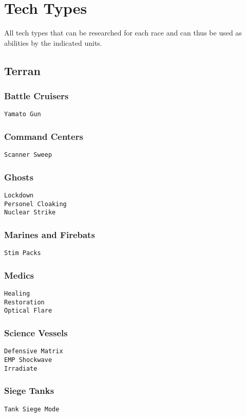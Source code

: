 \chapter{Tech Types}
\label{techtype}
All tech types that can be researched for each race and can thus be used as abilities by the indicated units.

\section{Terran}

\subsection{Battle Cruisers}
\verb|Yamato Gun|

\subsection{Command Centers}
\verb|Scanner Sweep| 

\subsection{Ghosts}
\verb|Lockdown| \\
\verb|Personel Cloaking| \\
\verb|Nuclear Strike|

\subsection{Marines and Firebats}
\verb|Stim Packs|

\subsection{Medics}
\verb|Healing| \\
\verb|Restoration| \\
\verb|Optical Flare|

\subsection{Science Vessels}
\verb|Defensive Matrix| \\
\verb|EMP Shockwave| \\
\verb|Irradiate| 

\subsection{Siege Tanks}
\verb|Tank Siege Mode| 

